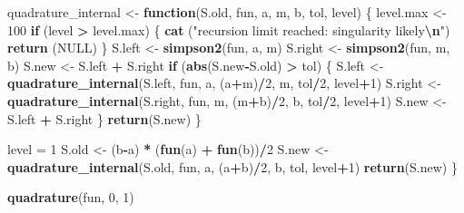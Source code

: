 \documentclass[
  spanish,
  10pt,
]{book}
\newenvironment{Shaded}{\begin{snugshade}}{\end{snugshade}}
\newcommand{\ConstantTok}[1]{\textcolor[rgb]{0.56,0.35,0.01}{#1}}
\newcommand{\ControlFlowTok}[1]{\textcolor[rgb]{0.13,0.29,0.53}{\textbf{#1}}}
\newcommand{\DecValTok}[1]{\textcolor[rgb]{0.00,0.00,0.81}{#1}}
\newcommand{\FunctionTok}[1]{\textcolor[rgb]{0.13,0.29,0.53}{\textbf{#1}}}
\newcommand{\NormalTok}[1]{#1}
\newcommand{\OtherTok}[1]{\textcolor[rgb]{0.56,0.35,0.01}{#1}}
\newcommand{\SpecialCharTok}[1]{\textcolor[rgb]{0.81,0.36,0.00}{\textbf{#1}}}
\newcommand{\StringTok}[1]{\textcolor[rgb]{0.31,0.60,0.02}{#1}}
\theoremstyle{break}
\theoremstyle{nonumberplain}
\begin{document}
\begin{Shaded}
\begin{Highlighting}[]
\NormalTok{    quadrature\_internal }\OtherTok{\textless{}{-}} \ControlFlowTok{function}\NormalTok{(S.old, fun, a, m, b, tol, level) \{}
\NormalTok{        level.max }\OtherTok{\textless{}{-}} \DecValTok{100}
        \ControlFlowTok{if}\NormalTok{ (level }\SpecialCharTok{\textgreater{}}\NormalTok{ level.max) \{}
            \FunctionTok{cat}\NormalTok{ (}\StringTok{"recursion limit reached: singularity likely}\SpecialCharTok{\textbackslash{}n}\StringTok{"}\NormalTok{)}
            \FunctionTok{return}\NormalTok{ (}\ConstantTok{NULL}\NormalTok{)}
\NormalTok{        \}}
\NormalTok{        S.left }\OtherTok{\textless{}{-}} \FunctionTok{simpson2}\NormalTok{(fun, a, m) }
\NormalTok{        S.right }\OtherTok{\textless{}{-}} \FunctionTok{simpson2}\NormalTok{(fun, m, b)}
\NormalTok{        S.new }\OtherTok{\textless{}{-}}\NormalTok{ S.left }\SpecialCharTok{+}\NormalTok{ S.right}
        \ControlFlowTok{if}\NormalTok{ (}\FunctionTok{abs}\NormalTok{(S.new}\SpecialCharTok{{-}}\NormalTok{S.old) }\SpecialCharTok{\textgreater{}}\NormalTok{ tol) \{}
\NormalTok{            S.left }\OtherTok{\textless{}{-}} \FunctionTok{quadrature\_internal}\NormalTok{(S.left, fun, }
\NormalTok{                                          a, (a}\SpecialCharTok{+}\NormalTok{m)}\SpecialCharTok{/}\DecValTok{2}\NormalTok{, m, tol}\SpecialCharTok{/}\DecValTok{2}\NormalTok{, level}\SpecialCharTok{+}\DecValTok{1}\NormalTok{)}
\NormalTok{            S.right }\OtherTok{\textless{}{-}} \FunctionTok{quadrature\_internal}\NormalTok{(S.right, fun, }
\NormalTok{                                           m, (m}\SpecialCharTok{+}\NormalTok{b)}\SpecialCharTok{/}\DecValTok{2}\NormalTok{, b, tol}\SpecialCharTok{/}\DecValTok{2}\NormalTok{, level}\SpecialCharTok{+}\DecValTok{1}\NormalTok{)}
\NormalTok{            S.new }\OtherTok{\textless{}{-}}\NormalTok{ S.left }\SpecialCharTok{+}\NormalTok{ S.right}
\NormalTok{        \}}
        \FunctionTok{return}\NormalTok{(S.new)}
\NormalTok{    \}}
 
\NormalTok{    level }\OtherTok{=} \DecValTok{1}
\NormalTok{    S.old }\OtherTok{\textless{}{-}}\NormalTok{ (b}\SpecialCharTok{{-}}\NormalTok{a) }\SpecialCharTok{*}\NormalTok{ (}\FunctionTok{fun}\NormalTok{(a) }\SpecialCharTok{+} \FunctionTok{fun}\NormalTok{(b))}\SpecialCharTok{/}\DecValTok{2}
\NormalTok{    S.new }\OtherTok{\textless{}{-}} \FunctionTok{quadrature\_internal}\NormalTok{(S.old, fun, }
\NormalTok{                                 a, (a}\SpecialCharTok{+}\NormalTok{b)}\SpecialCharTok{/}\DecValTok{2}\NormalTok{, b, tol, level}\SpecialCharTok{+}\DecValTok{1}\NormalTok{)}
    \FunctionTok{return}\NormalTok{(S.new)}
\NormalTok{\}}

\FunctionTok{quadrature}\NormalTok{(fun, }\DecValTok{0}\NormalTok{, }\DecValTok{1}\NormalTok{)}
\end{Highlighting}
\end{Shaded}
\end{document}
